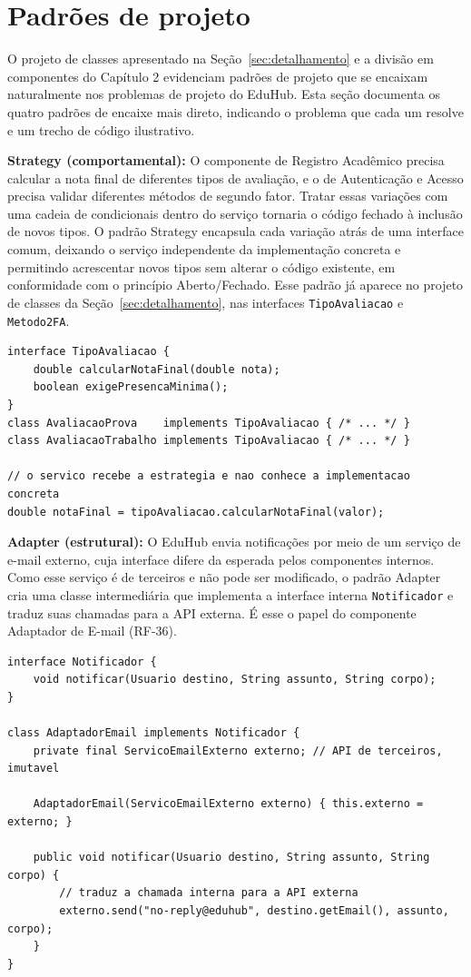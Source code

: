 \section{Padrões de projeto}

O projeto de classes apresentado na Seção~\ref{sec:detalhamento} e a divisão
em componentes do Capítulo 2 evidenciam padrões de projeto que se encaixam naturalmente nos problemas de
projeto do EduHub. Esta seção documenta os quatro padrões de encaixe mais
direto, indicando o problema que cada um resolve e um trecho de código
ilustrativo.

\textbf{Strategy (comportamental):} O componente de Registro Acadêmico
precisa calcular a nota final de diferentes tipos de avaliação, e o de
Autenticação e Acesso precisa validar diferentes métodos de segundo fator.
Tratar essas variações com uma cadeia de condicionais dentro do serviço
tornaria o código fechado à inclusão de novos tipos. O padrão Strategy
encapsula cada variação atrás de uma interface comum, deixando o serviço
independente da implementação concreta e permitindo acrescentar novos tipos
sem alterar o código existente, em conformidade com o princípio Aberto/Fechado.
Esse padrão já aparece no projeto de classes da Seção~\ref{sec:detalhamento},
nas interfaces \texttt{TipoAvaliacao} e \texttt{Metodo2FA}.

\begin{lstlisting}
interface TipoAvaliacao {
    double calcularNotaFinal(double nota);
    boolean exigePresencaMinima();
}
class AvaliacaoProva    implements TipoAvaliacao { /* ... */ }
class AvaliacaoTrabalho implements TipoAvaliacao { /* ... */ }

// o servico recebe a estrategia e nao conhece a implementacao concreta
double notaFinal = tipoAvaliacao.calcularNotaFinal(valor);
\end{lstlisting}

\textbf{Adapter (estrutural):} O EduHub envia notificações por meio de um
serviço de e-mail externo, cuja interface difere da esperada pelos componentes
internos. Como esse serviço é de terceiros e não pode ser modificado, o padrão
Adapter cria uma classe intermediária que implementa a interface interna
\texttt{Notificador} e traduz suas chamadas para a API externa. É esse o papel
do componente Adaptador de E-mail (RF-36).

\begin{lstlisting}
interface Notificador {
    void notificar(Usuario destino, String assunto, String corpo);
}

class AdaptadorEmail implements Notificador {
    private final ServicoEmailExterno externo; // API de terceiros, imutavel

    AdaptadorEmail(ServicoEmailExterno externo) { this.externo = externo; }

    public void notificar(Usuario destino, String assunto, String corpo) {
        // traduz a chamada interna para a API externa
        externo.send("no-reply@eduhub", destino.getEmail(), assunto, corpo);
    }
}
\end{lstlisting}

